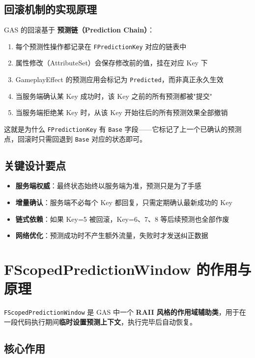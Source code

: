 \documentclass[10pt,CJKmath]{ctexart}
\begin{document}
\subsection{回滚机制的实现原理}

GAS 的回滚基于 \textbf{预测链（Prediction Chain）}：

\begin{enumerate}
	\item 每个预测性操作都记录在 \texttt{FPredictionKey} 对应的链表中
	\item 属性修改（AttributeSet）会保存修改前的值，挂在对应 Key 下
	\item GameplayEffect 的预测应用会标记为 \texttt{Predicted}，而非真正永久生效
	\item 当服务端确认某 Key 成功时，该 Key 之前的所有预测都被"提交"
	\item 当服务端拒绝某 Key 时，从该 Key 开始往后的所有预测效果全部撤销
\end{enumerate}

这就是为什么 \texttt{FPredictionKey} 有 \texttt{Base} 字段——它标记了上一个已确认的预测点，回滚时只需回退到 \texttt{Base} 对应的状态即可。

\subsection{关键设计要点}

\begin{itemize}
	\item \textbf{服务端权威}：最终状态始终以服务端为准，预测只是为了手感
	\item \textbf{增量确认}：服务端不必每个 Key 都回复，只需定期确认最新成功的 Key
	\item \textbf{链式依赖}：如果 Key=5 被回滚，Key=6、7、8 等后续预测也全部作废
	\item \textbf{网络优化}：预测成功时不产生额外流量，失败时才发送纠正数据
\end{itemize}

\section{FScopedPredictionWindow 的作用与原理}

\texttt{FScopedPredictionWindow} 是 GAS 中一个 \textbf{RAII 风格的作用域辅助类}，用于在一段代码执行期间\textbf{临时设置预测上下文}，执行完毕后自动恢复。

\subsection{核心作用}
\end{document}
